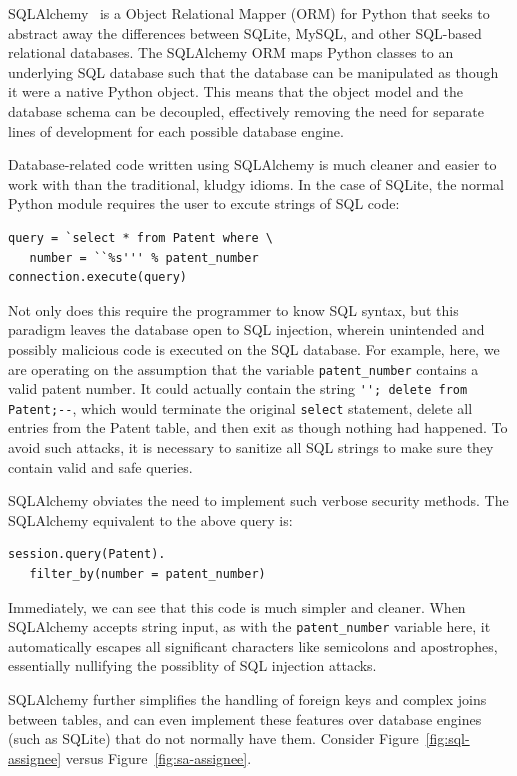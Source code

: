 SQLAlchemy~\cite{sqlalchemy} is a Object Relational Mapper (ORM) for Python
that seeks to abstract away the differences between SQLite, MySQL, and other
SQL-based relational databases. The SQLAlchemy ORM maps Python classes to an
underlying SQL database such that the database can be manipulated as though it
were a native Python object. This means that the object model and the database
schema can be decoupled, effectively removing the need for separate lines of
development for each possible database engine.

Database-related code written using SQLAlchemy is much cleaner and easier to
work with than the traditional, kludgy idioms. In the case of SQLite, the
normal Python module requires the user to excute strings of SQL code:
\begin{lstlisting}
query = `select * from Patent where \
   number = ``%s''' % patent_number
connection.execute(query)
\end{lstlisting}

Not only does this require the programmer to know SQL syntax, but this paradigm
leaves the database open to SQL injection, wherein unintended and possibly
malicious code is executed on the SQL database. For example, here, we are
operating on the assumption that the variable \verb`patent_number` contains a
valid patent number. It could actually contain the string \verb`''; delete from Patent;--`,
which would terminate the original \verb`select` statement, delete
all entries from the Patent table, and then exit as though nothing had
happened. To avoid such attacks, it is necessary to sanitize all SQL strings
to make sure they contain valid and safe queries.

SQLAlchemy obviates the need to implement such verbose security methods. The
SQLAlchemy equivalent to the above query is:

\begin{lstlisting}
session.query(Patent).
   filter_by(number = patent_number)
\end{lstlisting}

Immediately, we can see that this code is much simpler and cleaner. When
SQLAlchemy accepts string input, as with the \verb`patent_number` variable
here, it automatically escapes all significant characters like semicolons and
apostrophes, essentially nullifying the possiblity of SQL injection attacks.

SQLAlchemy further simplifies the handling of foreign keys and complex joins
between tables, and can even implement these features over database engines
(such as SQLite) that do not normally have them. Consider
Figure~\ref{fig:sql-assignee} versus Figure~\ref{fig:sa-assignee}.

